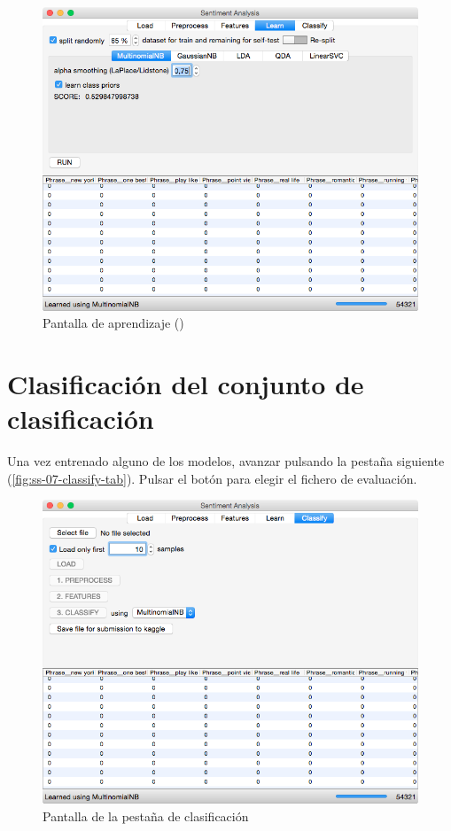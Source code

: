 \begin{figure}[H]
\centering
\includegraphics[width=14cm]{ss-06-learn-tab}
\caption{Pantalla de aprendizaje ()}
\label{fig:ss-06-learn-tab}
\end{figure}

\newpage
\section{Clasificación del conjunto de clasificación}

Una vez entrenado alguno de los modelos, avanzar pulsando la pestaña siguiente (\autoref{fig:ss-07-classify-tab}). Pulsar el botón  para elegir el fichero  de evaluación.

\begin{figure}[H]
\centering
\includegraphics[width=14cm]{ss-07-classify-tab}
\caption{Pantalla de la pestaña de clasificación}
\label{fig:ss-07-classify-tab}
\end{figure}

